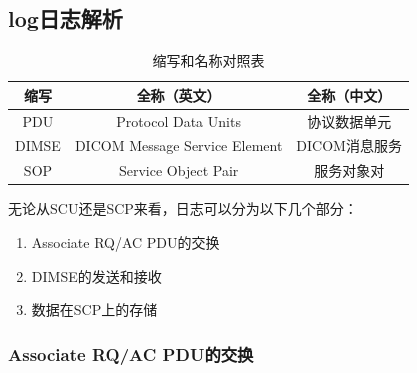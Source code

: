 \documentclass[UTF8]{ctexart}
\begin{document}
\subsection{log日志解析}

\begin{table}[H] 
    \centering  
    \caption{\label{tab:test}缩写和名称对照表}   
    \begin{tabular}{ccc}    
        \toprule    
        缩写 & 全称（英文） & 全称（中文） \\    
        \midrule   
        PDU & Protocol Data Units & 协议数据单元 \\   
        DIMSE & DICOM Message Service Element & DICOM消息服务 \\   
        SOP & Service Object Pair & 服务对象对 \\
        \bottomrule   
    \end{tabular}  
\end{table}

无论从SCU还是SCP来看，日志可以分为以下几个部分：
\begin{enumerate}
    \item Associate RQ/AC PDU的交换
    \item DIMSE的发送和接收
    \item 数据在SCP上的存储
\end{enumerate}

\subsubsection{Associate RQ/AC PDU的交换}
\end{document}
